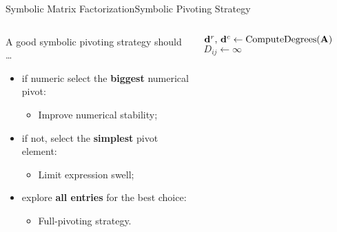 \begin{frame}{Symbolic Matrix Factorization}{Symbolic Pivoting Strategy}
  \vspace{-1.75em}
  \vspace{-0.75em}
  \begin{columns}
    \begin{column}[c]{0.5\textwidth}
      A good symbolic pivoting strategy should \dots
      \begin{itemize}
        \item if numeric select the \textbf{biggest} numerical pivot:
        \begin{itemize}
          \item[] Improve numerical stability;
        \end{itemize}
        \item if not, select the \textbf{simplest} pivot element:
        \begin{itemize}
          \item[] Limit expression swell;
        \end{itemize}
        \item explore \textbf{all entries} for the best choice:
        \begin{itemize}
          \item[] Full-pivoting strategy.
        \end{itemize}
      \end{itemize}
    \end{column}
    \begin{column}[c]{0.6\textwidth}
      \begin{algorithmic}\scriptsize
          \State $\mathbf{d}^r, \, \mathbf{d}^c \gets \text{ComputeDegrees}(\mathbf{A})$ %
              \State $D_{ij} \gets \infty$ %
              {} %

\end{algorithmic}
\end{column}
\end{columns}
\end{frame}
